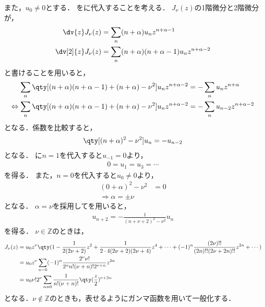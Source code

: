 \documentclass{report}
\begin{document}
      また，$u_0 \neq 0$とする．
      をに代入することを考える．
      $J_{\nu}(z)$の1階微分と2階微分が，
      \begin{align}
        \dv{z}J_{\nu}(z) &= \sum_{n}(n + \alpha)u_nz^{n + \alpha - 1} \\ 
        \dv[2]{z}J_{\nu}(z) &= \sum_{n}(n + \alpha)(n + \alpha - 1)u_nz^{n + \alpha - 2} 
      \end{align}
      と書けることを用いると，
      \begin{align}
        \sum_{n}\qty[(n + \alpha)(n + \alpha - 1) + (n + \alpha) - \nu^2]u_nz^{n + \alpha - 2} &= -\sum_{n}u_nz^{n + \alpha} \\ 
        \Leftrightarrow \sum_{n}\qty[(n + \alpha)(n + \alpha - 1) + (n + \alpha) - \nu^2]u_nz^{n + \alpha - 2} &= -\sum_{n}u_{n - 2}z^{n + \alpha -2} 
      \end{align}
      となる．係数を比較すると，
      \begin{align}
        \qty[(n + \alpha)^2 - \nu^2]u_n = -u_{n - 2}\label{bessel-func-recurr}
      \end{align}
      となる．
      に$n = 1$を代入すると$u_{-1} = 0$より，
      \begin{align}
        0 = u_1 = u_3 = \cdots
      \end{align}
      を得る．
      また，$n = 0$を代入すると$u_0 \neq 0$より，
      \begin{align}
        (0 + \alpha)^2 - \nu^2 &= 0 \\ 
        \Rightarrow \alpha = \pm \nu
      \end{align}
      となる．
      $\alpha = \nu$を採用してを用いると，
      \begin{align}
        u_{n + 2} = -\frac{1}{(n + \nu + 2)^2 - \nu^2}u_n 
      \end{align}
      を得る．
      $\nu \in \mathbb{Z}$のときは，
      \begin{align}
        J_{\nu}(z) &= u_0z^{\nu}\qty(1 - \frac{1}{2(2\nu + 2)}z^2 + \frac{1}{2\cdot 4(2\nu + 2)(2\nu + 4)}z^4 + \cdots + (-1)^n\frac{(2\nu)!!}{(2n)!!(2\nu + 2n)!!}z^{2n} + \cdots) \\ 
        &= u_0z^{\nu}\sum_{n = 0}(-1)^n\frac{2^{\nu}\nu!}{2^nn!(\nu + n)!2^{\nu + n}} z^{2n} \\ 
        &= u_0\nu!2^{\nu}\sum_{n = 0}\frac{1}{n!(\nu + n)!}\qty(\frac{z}{2})^{\nu + 2n}
      \end{align}
      となる．$\nu \notin \mathbb{Z}$のときも，表せるようにガンマ函数を用いて一般化する．
\end{document}

